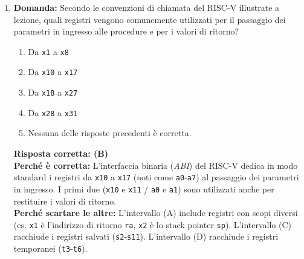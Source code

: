 \documentclass[12pt, a4paper]{article}
\begin{document}
\begin{enumerate}
    \item \textbf{Domanda:} Secondo le convenzioni di chiamata del RISC-V illustrate a lezione, quali registri vengono comunemente utilizzati per il passaggio dei parametri in ingresso alle procedure e per i valori di ritorno?
    \begin{enumerate}[label=(\Alph*)]
        \item Da \texttt{x1} a \texttt{x8}
        \item Da \texttt{x10} a \texttt{x17}
        \item Da \texttt{x18} a \texttt{x27}
        \item Da \texttt{x28} a \texttt{x31}
        \item Nessuna delle risposte precedenti è corretta.
    \end{enumerate}
    \textbf{Risposta corretta: (B)} \\
    \textbf{Perché è corretta:} L'interfaccia binaria (\textit{ABI}) del RISC-V dedica in modo standard i registri da \texttt{x10} a \texttt{x17} (noti come \texttt{a0}-\texttt{a7}) al passaggio dei parametri in ingresso. I primi due (\texttt{x10} e \texttt{x11} / \texttt{a0} e \texttt{a1}) sono utilizzati anche per restituire i valori di ritorno. \\
    \textbf{Perché scartare le altre:} L'intervallo (A) include registri con scopi diversi (es. \texttt{x1} è l'indirizzo di ritorno \texttt{ra}, \texttt{x2} è lo stack pointer \texttt{sp}). L'intervallo (C) racchiude i registri salvati (\texttt{s2}-\texttt{s11}). L'intervallo (D) racchiude i registri temporanei (\texttt{t3}-\texttt{t6}).


\end{enumerate}
\end{document}
